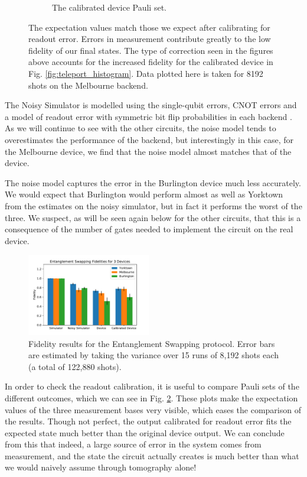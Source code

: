 \begin{figure}[h!]
\begin{subfigure}{.5\textwidth}
    \caption{The calibrated device Pauli set.}
    \label{fig:tele_pauli_dev}
  \end{subfigure}
  \caption{The expectation values match those we expect after calibrating for
readout error. Errors in measurement contribute greatly to the low fidelity of
our final states. The type of correction seen in the figures above accounts for
the increased fidelity for the calibrated device in Fig.
\ref{fig:teleport_histogram}. Data plotted here is taken for 8192 shots on the
Melbourne backend.}
  \label{fig:tele_paulis}
\end{figure}

The Noisy Simulator is modelled using the single-qubit
errors, CNOT errors and a model of readout error with symmetric bit flip
probabilities in each backend \cite{qiskit_org}. As we will continue to see with
the other circuits, the noise model tends to overestimates the performance of
the backend, but interestingly in this case, for the Melbourne device, we find
that the noise model almost matches that of the device.

The noise model captures the error in the Burlington device much less
accurately. We would expect that Burlington would perform almost as well as
Yorktown from the estimates on the noisy simulator, but in fact it performs the
worst of the three. We suspect, as will be seen again below for the other
circuits, that this is a consequence of the number of gates needed to implement
the circuit on the real device.

\begin{figure}[h!]
  \centering
  \includegraphics[width=0.48\textwidth]{images/results/swap_histogram.pdf}
	\caption{Fidelity results for the Entanglement Swapping protocol. Error bars
    are estimated by taking the variance over 15 runs of 8,192 shots each (a total
    of 122,880 shots).}
	\label{fig:swap_histogram}
\end{figure}

In order to check the readout calibration, it is useful to compare Pauli sets of
the different outcomes, which we can see in Fig. \ref{fig:tele_paulis}. These
plots make the expectation values of the three measurement bases very visible,
which eases the comparison of the results. Though not perfect, the output
calibrated for readout error fits the expected state much better than the
original device output. We can conclude from this that indeed, a large source of
error in the system comes from measurement, and the state the circuit actually
creates is much better than what we would naively assume through tomography
alone!

